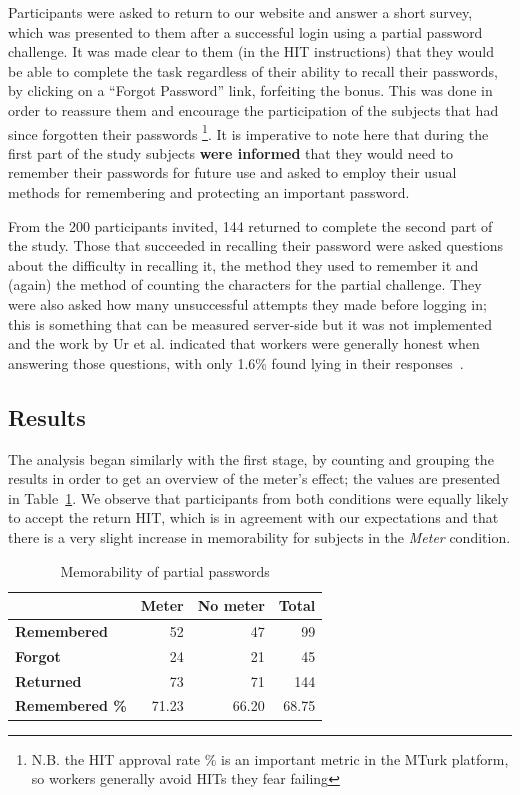     Participants were asked to return to our website and answer a short survey, which was presented to them after a successful login using a partial password challenge. It was made clear to them (in the HIT instructions) that they would be able to complete the task regardless of their ability to recall their passwords, by clicking on a ``Forgot Password'' link, forfeiting the bonus. This was done in order to reassure them and encourage the participation of the subjects that had since forgotten their passwords \footnote{N.B. the HIT approval rate \% is an important metric in the MTurk platform, so workers generally avoid HITs they fear failing}. It is imperative to note here that during the first part of the study subjects \textbf{were informed} that they would need to remember their passwords for future use and asked to employ their usual methods for remembering and protecting an important password.

    From the 200 participants invited, 144 returned to complete the second part of the study. Those that succeeded in recalling their password were asked questions about the difficulty in recalling it, the method they used to remember it and (again) the method of counting the characters for the partial challenge. They were also asked how many unsuccessful attempts they made before logging in; this is something that can be measured server-side but it was not implemented and the work by Ur et al. indicated that workers were generally honest when answering those questions, with only 1.6\% found lying in their responses~\cite{strength_meter_effect}.

  \subsection{Results}
    \label{ssec:memorability_results}

    The analysis began similarly with the first stage, by counting and grouping the results in order to get an overview of the meter's effect; the values are presented in Table~\ref{tab:memorability}. We observe that participants from both conditions were equally likely to accept the return HIT, which is in agreement with our expectations and that there is a very slight increase in memorability for subjects in the \emph{Meter} condition.

    \begin{table}[htpb]
      \centering
      \begin{tabular}{l rrr}
      \toprule
      & \textbf{Meter} & \textbf{No meter} & \textbf{Total} \\
      \midrule
       \textbf{Remembered} & 52 & 47 & 99 \\
       \textbf{Forgot} & 24 & 21 & 45 \\
       \textbf{Returned} & 73 & 71 & 144 \\
       \textbf{Remembered \%} & 71.23 & 66.20 & 68.75 \\
      \bottomrule
      \end{tabular}
      \caption{Memorability of partial passwords}
      \label{tab:memorability}
    \end{table}

